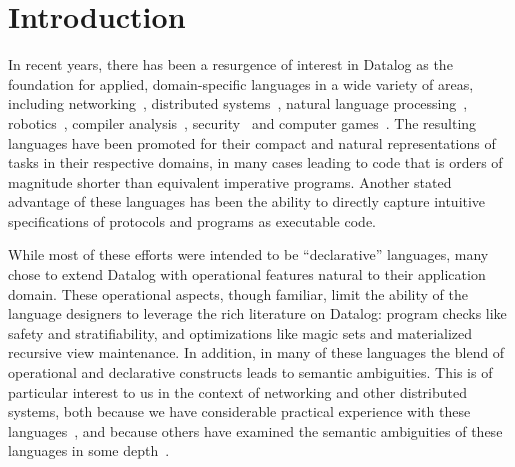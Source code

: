 \section{Introduction}




In recent years, there has been a resurgence of interest in Datalog as
the foundation for applied, domain-specific languages in a wide
variety of areas, including networking~\cite{Loo2009-CACM},
distributed systems~\cite{Belaramani:2009,Chu:2007}, natural language
processing~\cite{Eisner:2004}, robotics~\cite{Ashley-Rollman:2007},
compiler analysis~\cite{Lam:2005}, security~\cite{sd3,Li:2003,Zhou:2009}
and computer games~\cite{White:2007}.  The resulting languages have
been promoted for their compact and natural representations of tasks
in their respective domains, in many cases leading to code that is
orders of magnitude shorter than equivalent imperative programs.
Another stated advantage of these languages has been the ability to
directly capture intuitive specifications of protocols and programs as
executable code.

While most of these efforts were intended to be ``declarative''
languages, many chose to extend Datalog with operational features
natural to their application domain.  These operational aspects,
though familiar, limit the ability of the language designers to
leverage the rich literature on Datalog: program checks like safety
and stratifiability, and optimizations like magic sets and
materialized recursive view maintenance.  In addition, in many of
these languages the blend of operational and declarative constructs
leads to semantic ambiguities.  This is of particular interest to us
in the context of networking and other distributed systems, both
because we have considerable practical experience with these
languages~\cite{boom-eurosys,Loo2009-CACM}, and because others have
examined the semantic ambiguities of these languages in some
depth~\cite{Mao2009,navarro}.

